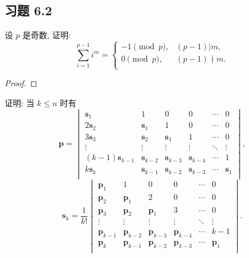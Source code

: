 \documentclass[color=black,device=normal,lang=cn,mode=geye]{elegantnote}
\begin{document}
\subsection{习题 6.2}
\begin{exercise}%
    设 $p$ 是奇数, 证明:
    \[\sum\limits_{i=1}^{p-1}i^m=\begin{cases}
        -1\pmod{p}, & (p-1)|m, \\
        0\pmod{p}, & (p-1)\nmid m. \\
    \end{cases}\]
\end{exercise}
\begin{proof}
\end{proof}
\begin{exercise}%
    证明: 当 $k\leq n$ 时有
    \[\mathbf{p}=\begin{vmatrix}
        \mathbf{s}_1 & 1 & 0 & 0 & \cdots & 0 \\
        2\mathbf{s}_2 & \mathbf{s}_1 & 1 & 0 & \cdots & 0 \\
        3\mathbf{s}_3 & \mathbf{s}_2 & \mathbf{s}_1 & 1 & \cdots & 0 \\
        \vdots & \vdots & \vdots & \vdots & \ddots & \vdots \\
        (k-1)\mathbf{s}_{k-1} & \mathbf{s}_{k-2} & \mathbf{s}_{k-3} & \mathbf{s}_{k-4} & \cdots & 1 \\
        k\mathbf{s}_k & \mathbf{s}_{k-1} & \mathbf{s}_{k-2} & \mathbf{s}_{k-3} & \cdots & \mathbf{s}_1 \\
    \end{vmatrix},\]
    \[\mathbf{s}_k=\dfrac{1}{k!}\begin{vmatrix}
        \mathbf{p}_1 & 1 & 0 & 0 & \cdots & 0 \\
        \mathbf{p}_2 & \mathbf{p}_1 & 2 & 0 & \cdots & 0 \\
        \mathbf{p}_3 & \mathbf{p}_2 & \mathbf{p}_1 & 3 & \cdots & 0 \\
        \vdots & \vdots & \vdots & \vdots & \ddots & \vdots \\
        \mathbf{p}_{k-1} & \mathbf{p}_{k-2} & \mathbf{p}_{k-3} & \mathbf{p}_{k-4} & \cdots & k-1 \\
        \mathbf{p}_k & \mathbf{p}_{k-1} & \mathbf{p}_{k-2} & \mathbf{p}_{k-3} & \cdots & \mathbf{p}_1 \\
    \end{vmatrix}.\]
\end{exercise}
\end{document}
